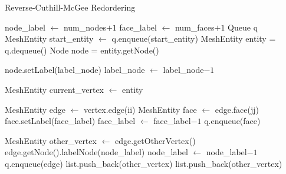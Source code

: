 \documentclass{article}
\begin{document}
        
\begin{algorithm}[ht]
\caption{Reverse-Cuthill-McGee Redordering}\label{RCM}
\begin{algorithmic}
    \State node\_label $\gets$ num\_nodes$ + 1$
    \State face\_label $\gets$ num\_faces$ + 1$
    \State Queue q
    \State MeshEntity start\_entity $\gets$ 
    \State q.enqueue(start\_entity)
        \State MeshEntity entity = q.dequeue()
        \State Node node = entity.getNode()

            \State node.setLabel(label\_node)
            \State label\_node $\gets$ label\_node$ - 1$
        \EndIf

            \State {}
            \State MeshEntity current\_vertex $\gets$ entity 

                MeshEntity edge $\gets$ vertex.edge(ii)
                    \State MeshEntity face $\gets$ edge.face(jj)
                        \State face.setLabel(face\_label)
                        \State face\_label $\gets$ face\_label$ - 1$
                    \EndIf
                            \State q.enqueue(face)
                        \EndIf

                    \EndIf
                \EndFor

                \State MeshEntity other\_vertex $\gets$ edge.getOtherVertex()
                        \State edge.getNode().labelNode(node\_label)
                        \State node\_label $\gets$ node\_label$ - 1$
                    \Else
                        \State q.enqueue(edge)
                        \State list.push\_back(other\_vertex)
                    \EndIf
                \Else
                        \State list.push\_back(other\_vertex)
                    \EndIf
                \EndIf
            \EndFor

\end{algorithmic}
\end{algorithm}
\end{document}
